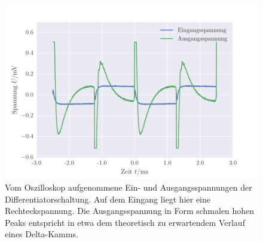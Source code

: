 \FloatBarrier
\begin{figure}[!h]
\centering
\includegraphics[scale=0.75]{../Grafiken/Differentiator_Oszilloskop_Rechteck.pdf}
\caption{Vom Oszilloskop aufgenommene Ein- und Ausgangsspannungen der Differentiatorschaltung. Auf dem Eingang
	liegt hier eine Rechteckspannung. Die Ausgangsspannung in Form schmalen hohen Peaks entspricht in etwa dem 
	theoretisch zu erwartendem Verlauf eines Delta-Kamms.\label{fig:differentiator_oszilloskop_rechteck}}
\end{figure}
\FloatBarrier